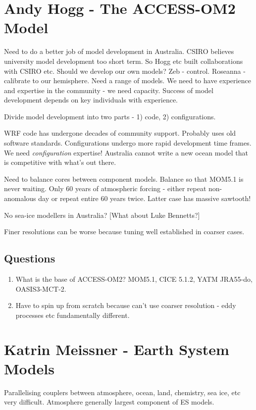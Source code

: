 \documentclass[12pt]{article}
\begin{document}
\section{Andy Hogg - The ACCESS-OM2 Model}
Need to do a better job of model development in Australia. CSIRO believes university model development too short term. So Hogg etc built collaborations with CSIRO etc. Should we develop our own models? Zeb - control. Roseanna - calibrate to our hemisphere. Need a range of models. We need to have experience and expertise in the community - we need capacity. Success of model development depends on key individuals with experience. 

Divide model development into two parts - 1) code, 2) configurations. 

WRF code has undergone decades of community support. Probably uses old software standards. Configurations undergo more rapid development time frames. We need \textit{configuration} expertise! Australia cannot write a new ocean model that is competitive with what's out there. 

Need to balance cores between component models. Balance so that MOM5.1 is never waiting. Only 60 years of atmospheric forcing - either repeat non-anomalous day or repeat entire 60 years twice. Latter case has massive sawtooth!

No sea-ice modellers in Australia? [What about Luke Bennetts?]   

Finer resolutions can be worse because tuning well established in coarser cases.

\subsection{Questions}
\begin{enumerate}
\item
What is the base of ACCESS-OM2? MOM5.1, CICE 5.1.2, YATM JRA55-do, OASIS3-MCT-2.
\item
Have to spin up from scratch because can't use coarser resolution - eddy processes etc fundamentally different.
\end{enumerate}

\section{Katrin Meissner - Earth System Models}
Parallelising couplers between atmosphere, ocean, land, chemistry, sea ice, etc very difficult. Atmosphere generally largest component of ES models.
\end{document}
